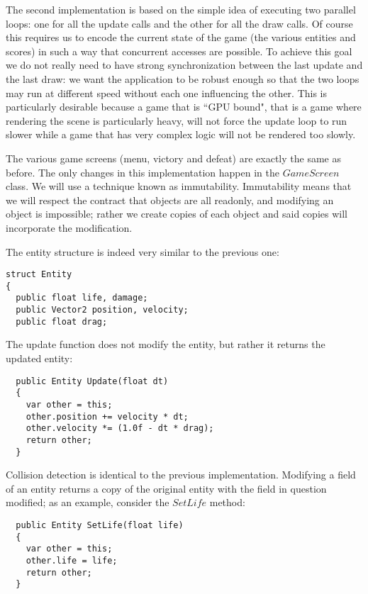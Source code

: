
The second implementation is based on the simple idea of executing two parallel loops: one for all the update calls and the other for all the draw calls. Of course this requires us to encode the current state of the game (the various entities and scores) in such a way that concurrent accesses are possible. To achieve this goal we do not really need to have strong synchronization between the last update and the last draw: we want the application to be robust enough so that the two loops may run at different speed without each one influencing the other. This is particularly desirable because a game that is ``GPU bound", that is a game where rendering the scene is particularly heavy, will not force the update loop to run slower while a game that has very complex logic will not be rendered too slowly.

The various game screens (menu, victory and defeat) are exactly the same as before. The only changes in this implementation happen in the $GameScreen$ class. We will use a technique known as immutability. Immutability means that we will respect the contract that objects are all readonly, and modifying an object is impossible; rather we create copies of each object and said copies will incorporate the modification.

The entity structure is indeed very similar to the previous one:
\begin{lstlisting}
struct Entity
{
  public float life, damage;
  public Vector2 position, velocity;
  public float drag;
\end{lstlisting}

The update function does not modify the entity, but rather it returns the updated entity:
\begin{lstlisting}
  public Entity Update(float dt)
  {
    var other = this;
    other.position += velocity * dt;
    other.velocity *= (1.0f - dt * drag);
    return other;
  }
\end{lstlisting}

Collision detection is identical to the previous implementation. Modifying a field of an entity returns a copy of the original entity with the field in question modified; as an example, consider the $SetLife$ method:
\begin{lstlisting}
  public Entity SetLife(float life)
  {
    var other = this;
    other.life = life;
    return other;
  }
\end{lstlisting}


